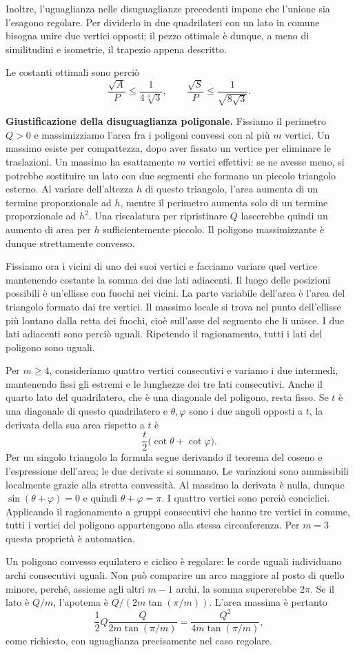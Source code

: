 {Inoltre, l'uguaglianza nelle disuguaglianze precedenti impone
che l'unione sia l'esagono regolare. Per dividerlo in due quadrilateri
con un lato in comune bisogna unire due vertici opposti;
il pezzo ottimale \`e dunque, a meno di similitudini e isometrie,
il trapezio appena descritto.

Le costanti ottimali sono perci\`o
\[
 \frac{\sqrt A}{P}\le\frac1{4\sqrt[4]{3}},
 \qquad
 \frac{\sqrt S}{P}\le\frac1{\sqrt{8\sqrt3}}.
\]

\textbf{Giustificazione della disuguaglianza poligonale.}
Fissiamo il perimetro $Q>0$ e massimizziamo l'area fra i poligoni
convessi con al pi\`u $m$ vertici. Un massimo esiste per compattezza,
dopo aver fissato un vertice per eliminare le traslazioni.
Un massimo ha esattamente $m$ vertici effettivi: se ne avesse meno,
si potrebbe sostituire un lato con due segmenti che formano un
piccolo triangolo esterno. Al variare dell'altezza $h$ di questo
triangolo, l'area aumenta di un termine proporzionale ad $h$,
mentre il perimetro aumenta solo di un termine proporzionale ad $h^2$.
Una riscalatura per ripristinare $Q$ lascerebbe quindi un aumento
di area per $h$ sufficientemente piccolo. Il poligono massimizzante
\`e dunque strettamente convesso.

Fissiamo ora i vicini di uno dei suoi vertici e facciamo variare
quel vertice mantenendo costante la somma dei due lati adiacenti.
Il luogo delle posizioni possibili \`e un'ellisse con fuochi nei vicini.
La parte variabile dell'area \`e l'area del triangolo formato dai tre
vertici. Il massimo locale si trova nel punto dell'ellisse pi\`u lontano
dalla retta dei fuochi, cio\`e sull'asse del segmento che li unisce.
I due lati adiacenti sono perci\`o uguali. Ripetendo il ragionamento,
tutti i lati del poligono sono uguali.

Per $m\ge4$, consideriamo quattro vertici consecutivi e variamo
i due intermedi, mantenendo fissi gli estremi e le lunghezze
dei tre lati consecutivi. Anche il quarto lato del quadrilatero,
che \`e una diagonale del poligono, resta fisso.
Se $t$ \`e una diagonale di questo quadrilatero e $\theta,\varphi$
sono i due angoli opposti a $t$, la derivata della sua area rispetto
a $t$ \`e
\[
 \frac{t}{2}\bigl(\cot\theta+\cot\varphi\bigr).
\]
Per un singolo triangolo la formula segue derivando il teorema
del coseno e l'espressione dell'area; le due derivate si sommano.
Le variazioni sono ammissibili localmente grazie alla stretta convessit\`a.
Al massimo la derivata \`e nulla, dunque
$\sin(\theta+\varphi)=0$ e quindi $\theta+\varphi=\pi$.
I quattro vertici sono perci\`o conciclici.
Applicando il ragionamento a gruppi consecutivi che hanno tre vertici
in comune, tutti i vertici del poligono appartengono alla stessa
circonferenza. Per $m=3$ questa propriet\`a \`e automatica.

Un poligono convesso equilatero e ciclico \`e regolare:
le corde uguali individuano archi consecutivi uguali. Non pu\`o
comparire un arco maggiore al posto di quello minore, perch\'e,
assieme agli altri $m-1$ archi, la somma supererebbe $2\pi$.
Se il lato \`e $Q/m$, l'apotema \`e
$Q/(2m\tan(\pi/m))$. L'area massima \`e pertanto
\[
 \frac12 Q\frac{Q}{2m\tan(\pi/m)}
 =\frac{Q^2}{4m\tan(\pi/m)},
\]
come richiesto, con uguaglianza precisamente nel caso regolare.
}
\renewcommand{\SoluzioniAlternative}{}
\renewcommand{\Osservazioni}{}
\renewcommand{\Commenti}{}
